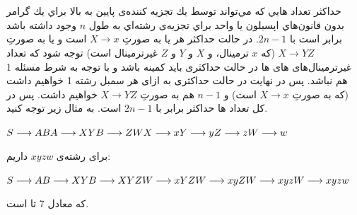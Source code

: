 \documentclass{article}
\begin{document}
\section{}%
حداكثر تعداد هايي كه مي‌تواند توسط يك تجزيه كننده‌ی پايين به بالا براي يك گرامر بدون قانون‌هاي اپسيلون يا واحد براي تجزيه‌ی رشته‌اي به طول $n$ وجود داشته باشد برابر است با $2n-1$. در حالت حداکثر هر  یا به صورتِ $X \longrightarrow x$ است و یا به صورتِ $X \longrightarrow YZ$ (که $x$ ترمینال، و $X$ و $Y$ و $Z$ غیرترمینال است) توجه شود که تعداد غیرترمینال‌های های ها در حالت حداکثری باید کمینه باشد و با توجه به شرط مسئله 1 هم نباشد. پس در نهایت در حالت حداکثری به ازای هر سمبل رشته 1  خواهیم داشت (که به صورتِ $X \longrightarrow x$ است) و $n-1$  هم به صورتِ  $X \longrightarrow YZ$ خواهیم داشت. پس در کل تعداد ها حداکثر برابر با $2n-1$ است. به مثال زیر توجه کنید.
\begin{latin}
$\\
S \longrightarrow  AB \\
A \longrightarrow XY \\
B \longrightarrow ZW \\
X \longrightarrow x \\
Y \longrightarrow y \\
Z \longrightarrow z \\
W \longrightarrow w
$
\end{latin}
برای رشته‌ی $xyzw$ داریم:
\begin{latin}
$\\
S \longrightarrow  AB \longrightarrow XYB \longrightarrow XYZW \longrightarrow xYZW \longrightarrow xyZW \longrightarrow xyzW \longrightarrow xyzw
$
\end{latin}
که معادل 7 تا  است.


\section{}%
\subsection{}
\end{document}
